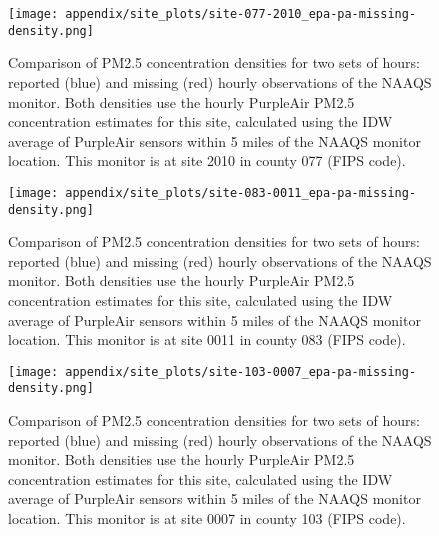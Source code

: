 \begin{figure}
\centering
\texttt{[image: appendix/site\_plots/site-077-2010\_epa-pa-missing-density.png]}
\caption{Comparison of PM2.5 concentration densities for two sets of hours: reported (blue) and missing (red) hourly observations of the NAAQS monitor. Both densities use the hourly PurpleAir PM2.5 concentration estimates for this site, calculated using the IDW average of PurpleAir sensors within 5 miles of the NAAQS monitor location. This monitor is at site 2010 in county 077 (FIPS code).}
\label{fig:missing-density_077-2010}
\end{figure}

\begin{figure}
\centering
\texttt{[image: appendix/site\_plots/site-083-0011\_epa-pa-missing-density.png]}
\caption{Comparison of PM2.5 concentration densities for two sets of hours: reported (blue) and missing (red) hourly observations of the NAAQS monitor. Both densities use the hourly PurpleAir PM2.5 concentration estimates for this site, calculated using the IDW average of PurpleAir sensors within 5 miles of the NAAQS monitor location. This monitor is at site 0011 in county 083 (FIPS code).}
\label{fig:missing-density_083-0011}
\end{figure}

\begin{figure}
\centering
\texttt{[image: appendix/site\_plots/site-103-0007\_epa-pa-missing-density.png]}
\caption{Comparison of PM2.5 concentration densities for two sets of hours: reported (blue) and missing (red) hourly observations of the NAAQS monitor. Both densities use the hourly PurpleAir PM2.5 concentration estimates for this site, calculated using the IDW average of PurpleAir sensors within 5 miles of the NAAQS monitor location. This monitor is at site 0007 in county 103 (FIPS code).}
\label{fig:missing-density_103-0007}
\end{figure}

